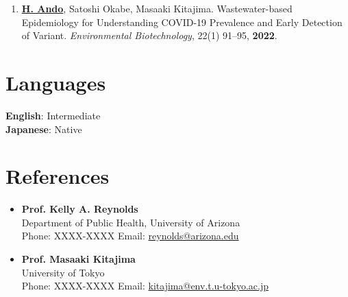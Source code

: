 \documentclass[11pt,a4paper]{article}
\begin{document}
\begin{enumerate}[label=\arabic*., series=pubcount, leftmargin=1.5em, nosep]
    \item \textbf{\underline{H. Ando}}, Satoshi Okabe, Masaaki Kitajima. Wastewater-based Epidemiology for Understanding COVID-19 Prevalence and Early Detection of Variant. \textit{Environmental Biotechnology}, 22(1) 91--95, \textbf{2022}.
\end{enumerate}



\section{Languages}
\textbf{English}: Intermediate \\
\textbf{Japanese}: Native

\vspace{10pt}

\section{References}

\begin{itemize}[leftmargin=1.5em, nosep]
    \item \textbf{Prof. Kelly A. Reynolds} \\
    Department of Public Health, University of Arizona \\
    Phone: XXXX-XXXX \quad Email: \href{mailto:reynolds@arizona.edu}{reynolds@arizona.edu}

    \vspace{5pt}

    \item \textbf{Prof. Masaaki Kitajima} \\
    University of Tokyo \\
    Phone: XXXX-XXXX \quad Email: \href{mailto:kitajima@env.t.u-tokyo.ac.jp}{kitajima@env.t.u-tokyo.ac.jp}
\end{itemize}
\end{document}
